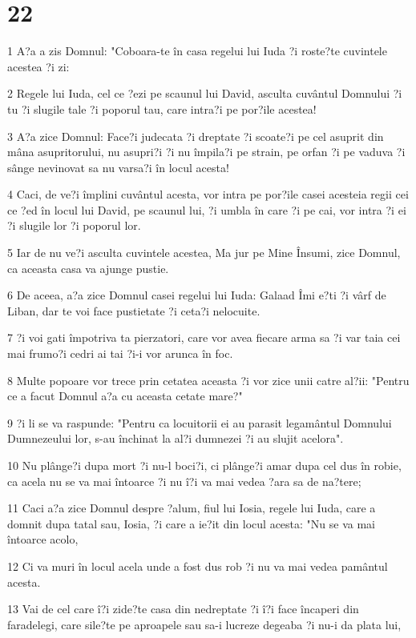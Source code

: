 \chapter{22}

\par 1 A?a a zis Domnul: "Coboara-te în casa regelui lui Iuda ?i roste?te cuvintele acestea ?i zi:
\par 2 Regele lui Iuda, cel ce ?ezi pe scaunul lui David, asculta cuvântul Domnului ?i tu ?i slugile tale ?i poporul tau, care intra?i pe por?ile acestea!
\par 3 A?a zice Domnul: Face?i judecata ?i dreptate ?i scoate?i pe cel asuprit din mâna asupritorului, nu asupri?i ?i nu împila?i pe strain, pe orfan ?i pe vaduva ?i sânge nevinovat sa nu varsa?i în locul acesta!
\par 4 Caci, de ve?i împlini cuvântul acesta, vor intra pe por?ile casei acesteia regii cei ce ?ed în locul lui David, pe scaunul lui, ?i umbla în care ?i pe cai, vor intra ?i ei ?i slugile lor ?i poporul lor.
\par 5 Iar de nu ve?i asculta cuvintele acestea, Ma jur pe Mine Însumi, zice Domnul, ca aceasta casa va ajunge pustie.
\par 6 De aceea, a?a zice Domnul casei regelui lui Iuda: Galaad Îmi e?ti ?i vârf de Liban, dar te voi face pustietate ?i ceta?i nelocuite.
\par 7 ?i voi gati împotriva ta pierzatori, care vor avea fiecare arma sa ?i var taia cei mai frumo?i cedri ai tai ?i-i vor arunca în foc.
\par 8 Multe popoare vor trece prin cetatea aceasta ?i vor zice unii catre al?ii: "Pentru ce a facut Domnul a?a cu aceasta cetate mare?"
\par 9 ?i li se va raspunde: "Pentru ca locuitorii ei au parasit legamântul Domnului Dumnezeului lor, s-au închinat la al?i dumnezei ?i au slujit acelora".
\par 10 Nu plânge?i dupa mort ?i nu-l boci?i, ci plânge?i amar dupa cel dus în robie, ca acela nu se va mai întoarce ?i nu î?i va mai vedea ?ara sa de na?tere;
\par 11 Caci a?a zice Domnul despre ?alum, fiul lui Iosia, regele lui Iuda, care a domnit dupa tatal sau, Iosia, ?i care a ie?it din locul acesta: "Nu se va mai întoarce acolo,
\par 12 Ci va muri în locul acela unde a fost dus rob ?i nu va mai vedea pamântul acesta.
\par 13 Vai de cel care î?i zide?te casa din nedreptate ?i î?i face încaperi din faradelegi, care sile?te pe aproapele sau sa-i lucreze degeaba ?i nu-i da plata lui,
